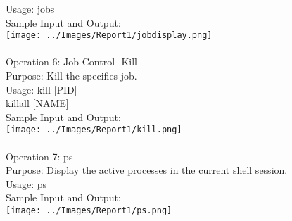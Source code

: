\documentclass[10pt,a4paper]{report}
\begin{document}
Usage: jobs\\
Sample Input and Output:\\
\texttt{[image: ../Images/Report1/jobdisplay.png]}\\
\\
Operation 6: Job Control- Kill\\
Purpose: Kill the specifies job.\\
Usage: kill [PID]\\
killall [NAME]\\
Sample Input and Output:\\
\texttt{[image: ../Images/Report1/kill.png]}\\
\\
Operation 7: ps\\
Purpose: Display the active processes in the current shell session.\\
Usage: ps\\
Sample Input and Output:\\
\texttt{[image: ../Images/Report1/ps.png]}\\
\\


\pagebreak
\end{document}
